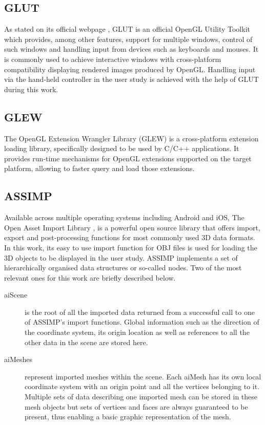 \subsection{GLUT}
\label{sec:glut}

As stated on its official webpage \cite{GLUT}, GLUT is an official OpenGL Utility Toolkit which provides, among other features, support for multiple windows, control of such windows and handling input from devices such as keyboards and mouses. It is commonly used to achieve interactive windows with cross-platform compatibility displaying rendered images produced by OpenGL. Handling input via the hand-held controller in the user study is achieved with the help of GLUT during this work.

\subsection{GLEW}
\label{sec:glew}

The OpenGL Extension Wrangler Library (GLEW)\cite{GLEW} is a cross-platform extension loading library, specifically designed to be used by C/C++ applications. It provides run-time mechanisms for OpenGL extensions supported on the target platform, allowing to faster query and load those extensions.

\subsection{ASSIMP}
\label{sec:assimp}

Available across multiple operating systems including Android and iOS, The Open Asset Import Library \cite{ASP}, is a powerful open source library that offers import, export and post-processing functions for most commonly used 3D data formats. In this work, its easy to use import function for OBJ files is used for loading the 3D objects to be displayed in the user study. ASSIMP implements a set of hierarchically organised data structures or so-called nodes. Two of the most relevant ones for this work are briefly described below.

\begin{description}
	\item[aiScene] is the root of all the imported data returned from a successful call to one of ASSIMP's import functions. Global information such as the direction of the coordinate system, its origin location as well as references to all the other data in the scene are stored here.
	\item[aiMeshes] represent imported meshes within the scene. Each aiMesh has its own local coordinate system with an origin point and all the vertices belonging to it. Multiple sets of data describing one imported mesh can be stored in these mesh objects but sets of vertices and faces are always guaranteed to be present, thus enabling a basic graphic representation of the mesh.
\end{description}

